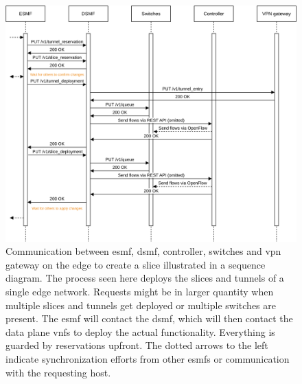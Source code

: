 \begin{figure}[H]
  \centering
  \includegraphics[width=\linewidth]{images/chapter_6/slice_creation_edge.png}
  \caption[Slice creation on an edge network]{Communication between \acrshort{esmf}, \acrshort{dsmf}, controller, switches and \acrshort{vpn} gateway on the edge to create a slice illustrated in a sequence diagram. The process seen here deploys the slices and tunnels of a single edge network. Requests might be in larger quantity when multiple slices and tunnels get deployed or multiple switches are present. The \acrshort{esmf} will contact the \acrshort{dsmf}, which will then contact the data plane \acrshort{vnf}s to deploy the actual functionality. Everything is guarded by reservations upfront. The dotted arrows to the left indicate synchronization efforts from other \acrshort{esmf}s or communication with the requesting host.}
  \label{fig:slice_creation_edge}
\end{figure}
